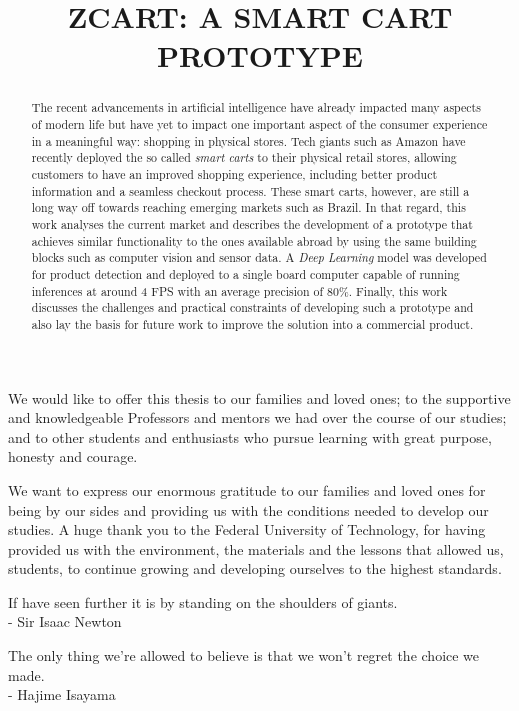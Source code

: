 \documentclass[openright]{normas-utf-tex} %
\title{\MakeUppercase{zCart: A smart cart prototype}} %
\begin{document}
\capa %
\folhaderosto %

\begin{dedicatoria}
We would like to offer this thesis to our families and loved ones;
to the supportive and knowledgeable Professors and mentors we had
over the course of our studies; and to other students and enthusiasts
who pursue learning with great purpose, honesty and courage.
\end{dedicatoria}

\begin{agradecimentos}
We want to express our enormous gratitude to our families and loved ones 
for being by our sides and providing us with the conditions needed to develop our studies.
A huge thank you to the Federal University of Technology, for having
provided us with the environment, the materials and the lessons	that allowed us,
students, to continue growing and developing ourselves to the highest standards.
\end{agradecimentos}

\begin{epigrafe}
 If have seen further it is by standing on the shoulders of giants.  \\
- Sir Isaac Newton

 The only thing we're allowed to believe is that we won't regret the choice we made.  \\
- Hajime Isayama
\end{epigrafe}

\begin{abstract}
The recent advancements in artificial intelligence have already impacted many
aspects of modern life but have yet to impact one important aspect of the
consumer experience in a meaningful way: shopping in physical stores. Tech
giants such as Amazon have recently deployed the so called \textit{smart
carts} to their physical retail stores, allowing customers to have an
improved shopping experience, including better product information and a
seamless checkout process. These  smart carts, however, are still a long
way off towards reaching emerging markets such as Brazil. In that regard,
this work analyses the current market and describes the development of a
prototype that achieves similar functionality to the ones available abroad
by using the same building blocks such as computer vision and sensor data.
A \textit{Deep Learning} model was developed for product detection and deployed
to a single board computer capable of running inferences at around 4
FPS with an average precision of 80\%.
Finally, this work discusses the challenges and practical constraints
of developing such a prototype and also lay the basis for future work to
improve the solution into a commercial product.
\end{abstract}
\end{document}

